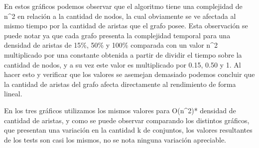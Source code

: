 En estos gráficos podemos observar que el algoritmo tiene una complejidad de n^2 en relación a la cantidad de nodos, la cual obviamente se ve afectada al mismo tiempo por la cantidad de aristas que el grafo posee. Esta observación se puede notar ya que cada grafo presenta la complejidad temporal para una densidad de aristas de 15\%, 50\% y 100\% comparada con un valor n^2 multiplicado por una constante obtenida a partir de dividir el tiempo sobre la cantidad de nodos, y a su vez este valor es multiplicado por 0.15, 0.50 y 1.
Al hacer esto y verificar que los valores se asemejan demasiado podemos concluir que la cantidad de aristas del grafo afecta directamente al rendimiento de forma lineal.

En los tres gráficos utilizamos los mismos valores para O(n^2)* densidad de cantidad de aristas, y como se puede observar comparando los distintos gráficos, que presentan una variación en la cantidad k de conjuntos, los valores resultantes de los tests son casi los mismos, no se nota ninguna variación apreciable. 





